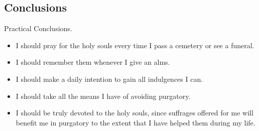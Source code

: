 \documentclass{beamer}
\begin{document}
\subsection{Conclusions}

\begin{frame}{Practical Conclusions.}
\begin{itemize}
\item I should pray for the holy souls every time I pass a cemetery or  see  a
   funeral.


\item I should remember them whenever I give an alms.


\item I should make a daily intention to gain all indulgences I can.


\item I should take all the means I have of avoiding purgatory.


\item I should be truly devoted to the holy souls, since suffrages offered for
   me will benefit me in purgatory to the extent that I  have  helped  them
   during my life.
\end{itemize}
\end{frame}
\end{document}
